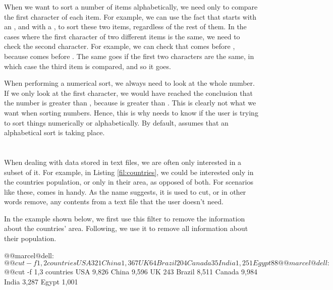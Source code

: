 \begin{my_box}
When we want to sort a number of items alphabetically, we need only to compare the first character of each item. For example, we can use the fact that  starts with an , and  with a , to sort these two items, regardless of the rest of them. In the cases where the first character of two different items is the same, we need to check the second character. For example, we can check that  comes before , because  comes before . The same goes if the first two characters are the same, in which case the third item is compared, and so it goes.

When performing a numerical sort, we always need to look at the whole number. If we only look at the first character, we would have reached the conclusion that the number  is greater than , because  is greater than . This is clearly not what we want when sorting numbers. Hence, this is why  needs to know if the user is trying to sort things numerically or alphabetically. By default,  assumes that an alphabetical sort is taking place.
\end{my_box}

\section{}

When dealing with data stored in text files, we are often only interested in a subset of it. For example, in Listing \ref{fil:countries}, we could be interested only in the countries population, or only in their area, as opposed of both. For scenarios like these,  comes in handy. As the name suggests, it is used to cut, or in other words remove, any contents from a text file that the user doesn't need.

In the example shown below, we first use this filter to remove the information about the countries' area. Following, we use it to remove all information about their population.

\begin{command_line}[Bash]
@@marcel@dell:~$ @@cut -f 1,2 countries
USA     321
China   1,367
UK      64
Brazil  204
Canada  35
India   1,251
Egypt   88
@@marcel@dell:~$ @@cut -f 1,3 countries
USA     9,826
China   9,596
UK      243
Brazil  8,511
Canada  9,984
India   3,287
Egypt   1,001
\end{command_line}


